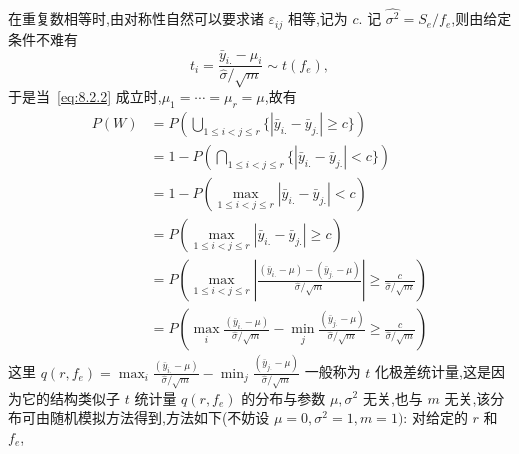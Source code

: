 在重复数相等时,由对称性自然可以要求诸 $\varepsilon_{ij}$ 相等,记为 $c$. 记 $\hat{\sigma^2} = S_e/f_e$,则由给定条件不难有
\begin{equation*}
  t_i = \frac{\bar{y}_{i.} - \mu_i}{\hat{\sigma}/\sqrt{m}} \sim t(f_e),
\end{equation*}
于是当~\eqref{eq:8.2.2} 成立时,$\mu_1 = \cdots = \mu_r = \mu$,故有
\begin{align*}
  P(W)  & = P\left(\bigcup_{1\leq i < j \leq r} \{|\bar{y}_{i.} - \bar{y}_{j.}| \geq c\}\right)\\
        & = 1- P\left(\bigcap_{1\leq i < j \leq r} \{|\bar{y}_{i.} - \bar{y}_{j.}| < c\}\right)\\
        & = 1 - P(\max_{1\leq i < j \leq r} |\bar{y}_{i.} - \bar{y}_{j.}| < c) \\
        & = P(\max_{1\leq i < j \leq r} |\bar{y}_{i.} - \bar{y}_{j.}| \geq c) \\
        & = P\left(\max_{1 \leq i < j \leq r} \left|\frac{(\bar{y}_{i.}-\mu) - (\bar{y}_{j.}-\mu)}{\hat{\sigma}/\sqrt{m}}\right|\geq \frac{c}{\hat{\sigma}/\sqrt{m}}\right)\\
        & = P\left(\max_{i} \frac{(\bar{y}_{i.}-\mu)}{\hat{\sigma}/\sqrt{m}} - \min_{j}\frac{(\bar{y}_{j.}-\mu)}{\hat{\sigma}/\sqrt{m}}\geq \frac{c}{\hat{\sigma}/\sqrt{m}}\right)
\end{align*}
这里 $q(r,f_e)=\max_{i} \frac{(\bar{y}_{i.}-\mu)}{\hat{\sigma}/\sqrt{m}} - \min_{j} \frac{(\bar{y}_{j.}-\mu)}{\hat{\sigma}/\sqrt{m}}$ 一般称为 $t$ 化极差统计量,这是因为它的结构类似子 $t$ 统计量 $q(r,f_e)$ 的分布与参数 $\mu, \sigma^2$ 无关,也与 $m$ 无关,该分布可由随机模拟方法得到,方法如下(不妨设 $\mu=0, \sigma^2=1, m=1)$: 对给定的 $r$ 和 $f_e$,
